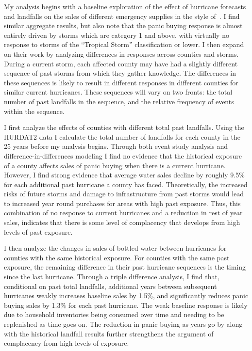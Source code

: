 \documentclass{article}
\begin{document}
My analysis begins with a baseline exploration of the effect of hurricane forecasts and landfalls on the sales of different emergency supplies in the style of~\cite{beatty2019disaster}. I find similar aggregate results, but also note that the panic buying response is almost entirely driven by storms which are category 1 and above, with virtually no response to storms of the ``Tropical Storm'' classification or lower. I then expand on their work by analyzing differences in responses across counties and storms. During a current storm, each affected county may have had a slightly different sequence of past storms from which they gather knowledge. The differences in these sequences is likely to result in different responses in different counties for similar current hurricanes. These sequences will vary on two fronts: the total number of past landfalls in the sequence, and the relative frequency of events within the sequence. 

I first analyze the effects of counties with different total past landfalls. Using the HURDAT2 data I calculate the total number of landfalls for each county in the 25 years before my analysis begins. Through both event study analysis and difference-in-differences modeling I find no evidence that the historical exposure of a county affects sales of panic buying when there is a current hurricane. However, I find strong evidence that average water sales decline by roughly 9.5\% for each additional past hurricane a county has faced. Theoretically, the increased risks of future storms and damage to infrastructure from past storms would lead to increased year round purchases for areas with high past exposure. Thus, this combination of no response to current hurricanes and a reduction in rest of year sales, indicates that there is some level of complacency that develops from high levels of past exposure. 

I then analyze the changes in sales of bottled water between hurricanes for counties with the same historical exposure.  For counties with the same past exposure, the remaining difference in their past hurricane sequences is the timing since the last hurricane. Through a triple difference analysis, I find that, conditional on past total landfalls, additional years between subsequent hurricanes weakly increases baseline sales by 1.5\%, and significantly reduces panic buying sales by 1.3\% for each past hurricane.  The weak baseline response is likely due to household inventories being consumed over time and needing to be replenished as time goes on. The reduction in panic buying as years go by along with the historical landfall results further strengthens the argument of complacency from high levels of exposure. 
\end{document}
